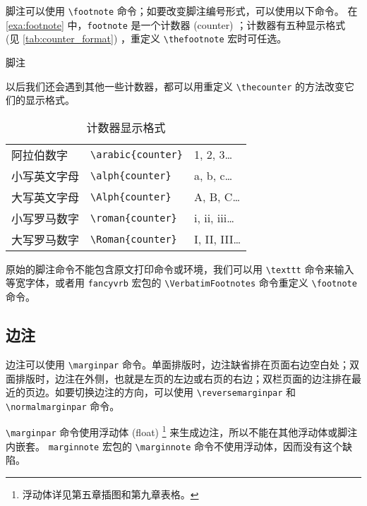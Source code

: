 脚注可以使用 \verb|\footnote| 命令；如要改变脚注编号形式，可以使用以下命令。
在 \autoref{exa:footnote} 中，\verb|footnote| 是一个计数器 (counter) ；计数器有五种显示格式 (见 \autoref{tab:counter_format}) ，重定义 \verb|\thefootnote| 宏时可任选。

\begin{example}[h]
\begin{Code}[numbers=left]
\renewcommand{\thefootnote}{\roman{footnote}} %
\end{Code}
\caption{脚注}
\label{exa:footnote}
\end{example}

以后我们还会遇到其他一些计数器，都可以用重定义 \verb|\thecounter| 的方法改变它们的显示格式。

\begin{table}
\centering
\caption{计数器显示格式}
\label{tab:counter_format}
\begin{tabular}{lll}
  \toprule
  阿拉伯数字 & \verb|\arabic{counter}| & 1, 2, 3\dots \\
  小写英文字母 & \verb|\alph{counter}| & a, b, c\dots \\
  大写英文字母 & \verb|\Alph{counter}| & A, B, C\dots \\
  小写罗马数字 & \verb|\roman{counter}| & i, ii, iii\dots \\
  大写罗马数字 & \verb|\Roman{counter}| & I, II, III\dots \\
  \bottomrule
\end{tabular}
\end{table}

原始的脚注命令不能包含原文打印命令或环境，我们可以用 \verb|\texttt| 命令来输入等宽字体，或者用 \texttt{fancyvrb} 宏包的 \verb|\VerbatimFootnotes| 命令重定义 \verb|\footnote| 命令。

\subsection{边注}

边注可以使用 \verb|\marginpar| 命令。单面排版时，边注缺省排在页面右边空白处；双面排版时，边注在外侧，也就是左页的左边或右页的右边；双栏页面的边注排在最近的页边。如要切换边注的方向，可以使用 \verb|\reversemarginpar| 和 \verb|\normalmarginpar| 命令。

\verb|\marginpar| 命令使用浮动体 (float) \footnote{浮动体详见第五章插图和第九章表格。} 来生成边注，所以不能在其他浮动体或脚注内嵌套。 \texttt{marginnote} 宏包的 \verb|\marginnote| 命令不使用浮动体，因而没有这个缺陷。


